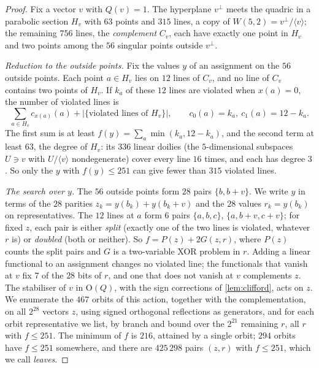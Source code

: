 \documentclass[11pt]{article}
\theoremstyle{definition}
\theoremstyle{remark}
\newcommand{\GO}{\mathrm{O}}
\begin{document}
\begin{proof}
Fix a vector $v$ with $Q(v)=1$.
The hyperplane $v^\perp$ meets the quadric in a parabolic section $H_v$ with $63$ points and $315$ lines, a copy of $W(5,2)=v^\perp/\langle v\rangle$; the remaining $756$ lines, the \emph{complement} $C_v$, each have exactly one point in $H_v$ and two points among the $56$ singular points outside $v^\perp$.

\emph{Reduction to the outside points.}
Fix the values $y$ of an assignment on the $56$ outside points.
Each point $a\in H_v$ lies on $12$ lines of $C_v$, and no line of $C_v$ contains two points of $H_v$.
If $k_a$ of these $12$ lines are violated when $x(a)=0$, the number of violated lines is
\begin{equation}\label{eq:split}
\sum_{a\in H_v}c_{x(a)}(a)+\bigl|\{\text{violated lines of }H_v\}\bigr|,\qquad c_0(a)=k_a,\ c_1(a)=12-k_a.
\end{equation}
The first sum is at least $f(y)=\sum_a\min(k_a,12-k_a)$, and the second term at least $63$, the degree of $H_v$: its $336$ linear doilies (the $5$-dimensional subspaces $U\ni v$ with $U/\langle v\rangle$ nondegenerate) cover every line $16$ times, and each has degree $3$.
So only the $y$ with $f(y)\le251$ can give fewer than $315$ violated lines.

\emph{The search over $y$.}
The $56$ outside points form $28$ pairs $\{b,b+v\}$.
We write $y$ in terms of the $28$ parities $z_k=y(b_k)+y(b_k+v)$ and the $28$ values $r_k=y(b_k)$ on representatives.
The $12$ lines at $a$ form $6$ pairs $\{a,b,c\}$, $\{a,b+v,c+v\}$; for fixed $z$, each pair is either \emph{split} (exactly one of the two lines is violated, whatever $r$ is) or \emph{doubled} (both or neither).
So $f=P(z)+2G(z,r)$, where $P(z)$ counts the split pairs and $G$ is a two-variable XOR problem in $r$.
Adding a linear functional to an assignment changes no violated line; the functionals that vanish at $v$ fix $7$ of the $28$ bits of $r$, and one that does not vanish at $v$ complements $z$.
The stabiliser of $v$ in $\GO(Q)$, with the sign corrections of \cref{lem:clifford}, acts on $z$.
We enumerate the $467$ orbits of this action, together with the complementation, on all $2^{28}$ vectors $z$, using signed orthogonal reflections as generators, and for each orbit representative we list, by branch and bound over the $2^{21}$ remaining $r$, all $r$ with $f\le251$.
The minimum of $f$ is $216$, attained by a single orbit; $294$ orbits have $f\le251$ somewhere, and there are $425\,298$ pairs $(z,r)$ with $f\le251$, which we call \emph{leaves}.


\end{proof}
\end{document}
